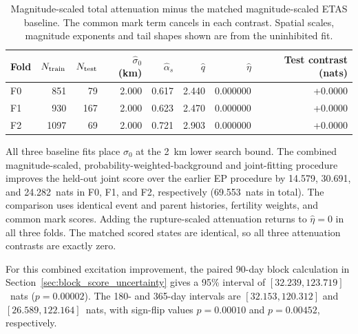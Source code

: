 \begin{table}[htbp]
\centering
\small
\begin{tabular}{lrrrrrrr}
\toprule
Fold & $N_{\rm train}$ & $N_{\rm test}$ & $\widehat\sigma_0$ (km) & $\widehat\alpha_s$ & $\widehat q$ & $\widehat\eta$ & Test contrast (nats) \\
\midrule
F0 & 851 & 79 & 2.000 & 0.617 & 2.440 & 0.000000 & +0.0000 \\
F1 & 930 & 167 & 2.000 & 0.623 & 2.470 & 0.000000 & +0.0000 \\
F2 & 1097 & 69 & 2.000 & 0.721 & 2.903 & 0.000000 & +0.0000 \\
\bottomrule
\end{tabular}
\caption{Magnitude-scaled total attenuation minus the matched magnitude-scaled
ETAS baseline. The common mark term cancels in each contrast. Spatial scales,
magnitude exponents and tail shapes shown are from the uninhibited fit.}
\label{tab:epplus_benchmark}
\end{table}
All three baseline fits place $\sigma_0$ at the 2~km lower search bound. The combined magnitude-scaled, probability-weighted-background and joint-fitting procedure improves the held-out joint score over the earlier EP procedure by 14.579, 30.691, and 24.282~nats in F0, F1, and F2, respectively (69.553~nats in total). The comparison uses identical event and parent histories, fertility weights, and common mark scores. Adding the rupture-scaled attenuation returns to $\widehat\eta=0$ in all three folds. The matched scored states are identical, so all three attenuation contrasts are exactly zero.

For this combined excitation improvement, the paired 90-day block calculation in Section~\ref{sec:block_score_uncertainty} gives a 95\% interval of $[32.239,123.719]$~nats ($p=0.00002$). The 180- and 365-day intervals are $[32.153,120.312]$ and $[26.589,122.164]$~nats, with sign-flip values $p=0.00010$ and $p=0.00452$, respectively.
